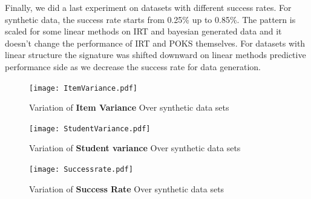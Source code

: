 Finally, we did a last experiment on datasets with different success rates. For synthetic data, the success rate starts from 0.25\% up to 0.85\%. The pattern is scaled for some linear methods on IRT and bayesian generated data and it doesn't change the performance of IRT and POKS themselves. For datasets with linear structure the signature was shifted downward on linear methods predictive performance side as we decrease the success rate for data generation.


\begin{figure}
  \centering
    \texttt{[image: ItemVariance.pdf]}
\caption{Variation of \textbf{Item Variance} Over synthetic data sets}
\label{figitemVar}
\end{figure}

\begin{figure}
  \centering
    \texttt{[image: StudentVariance.pdf]}
\caption{Variation of \textbf{Student variance} Over synthetic data sets}
\label{figStudentVar}
\end{figure}


\begin{figure}
  \centering
    \texttt{[image: Successrate.pdf]}
\caption{Variation of \textbf{Success Rate} Over synthetic data sets}
\label{figSucceessRate}
\end{figure}








